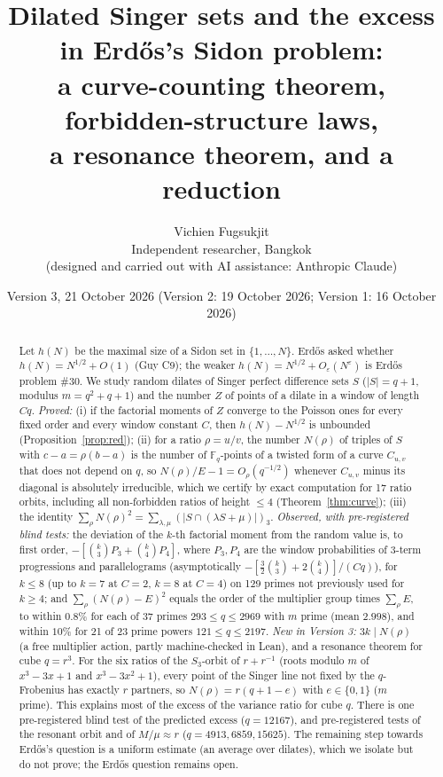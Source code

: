 \documentclass[11pt]{article}
\title{Dilated Singer sets and the excess in Erd\H{o}s's Sidon problem:\\ a curve-counting theorem, forbidden-structure laws,\\ a resonance theorem, and a reduction}
\author{Vichien Fugsukjit\\ Independent researcher, Bangkok\\ \small(designed and carried out with AI assistance: Anthropic Claude)}
\date{Version 3, 21 October 2026 (Version 2: 19 October 2026; Version 1: 16 October 2026)}
\begin{document}
\maketitle
\begin{abstract}
Let $h(N)$ be the maximal size of a Sidon set in $\{1,\dots,N\}$. Erd\H{o}s asked whether $h(N)=N^{1/2}+O(1)$ (Guy C9); the weaker
$h(N)=N^{1/2}+O_\varepsilon(N^\varepsilon)$ is Erd\H{o}s problem \#30. We study random dilates of Singer perfect difference sets $S$
($|S|=q+1$, modulus $m=q^2+q+1$) and the number $Z$ of points of a dilate in a window of length $Cq$.
\emph{Proved:} (i) if the factorial moments of $Z$ converge to the Poisson ones for every fixed order and every window constant $C$, then $h(N)-N^{1/2}$ is unbounded
(Proposition~\ref{prop:red}); (ii) for a ratio $\rho=u/v$, the number $N(\rho)$ of triples of $S$ with $c-a=\rho(b-a)$ is the number
of $\mathbb F_q$-points of a twisted form of a curve $C_{u,v}$ that does not depend on $q$, so $N(\rho)/E-1=O_\rho(q^{-1/2})$ whenever
$C_{u,v}$ minus its diagonal is absolutely irreducible, which we certify by exact computation for 17 ratio orbits, including all
non-forbidden ratios of height $\le4$ (Theorem~\ref{thm:curve}); (iii) the identity $\sum_\rho N(\rho)^2=\sum_{\lambda,\mu}(|S\cap(\lambda S+\mu)|)_3$.
\emph{Observed, with pre-registered blind tests:} the deviation of the $k$-th factorial moment from the random value is, to first order,
$-[\binom k3P_3+\binom k4P_4]$, where $P_3,P_4$ are the window probabilities of 3-term progressions and parallelograms (asymptotically
$-[\tfrac32\binom k3+2\binom k4]/(Cq)$), for $k\le8$ (up to $k=7$ at $C=2$, $k=8$ at $C=4$) on 129 primes not previously used for $k\ge4$; and $\sum_\rho(N(\rho)-E)^2$ equals the order of the multiplier
group times $\sum_\rho E$, to within $0.8\%$ for each of 37 primes $293\le q\le2969$ with $m$ prime (mean $2.998$),
and within $10\%$ for 21 of 23 prime powers $121\le q\le2197$. \emph{New in Version 3:} $3k\mid N(\rho)$ (a free multiplier action, partly machine-checked in Lean), and a resonance theorem for cube $q=r^3$. For the six ratios of the $S_3$-orbit of $r+r^{-1}$ (roots modulo $m$ of $x^3-3x+1$ and $x^3-3x^2+1$), every point of the Singer line not fixed by the $q$-Frobenius has exactly $r$ partners, so $N(\rho)=r(q+1-e)$ with $e\in\{0,1\}$ ($m$ prime). This explains most of the excess of the variance ratio for cube $q$. There is one pre-registered blind test of the predicted excess ($q=12167$), and pre-registered tests of the resonant orbit and of $M/\mu\approx r$ ($q=4913,6859,15625$). The remaining step towards Erd\H{o}s's question is a uniform estimate
(an average over dilates), which we isolate but do not prove; the Erd\H{o}s question remains open.
\end{abstract}
\end{document}
